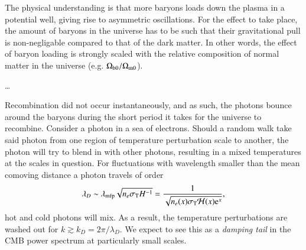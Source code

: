     The physical understanding is that more baryons loads down the plasma in a potential well, giving rise to asymmetric oscillations. For the effect to take place, the amount of baryons in the universe has to be such that their gravitational pull is non-negligable compared to that of the dark matter. In other words, the effect of baryon loading is strongly scaled with the relative composition of normal matter in the universe (e.g. $\Omega_\mathrm{b0}/\Omega_{\mathrm{m}0}$).
    
     \dots
    
    Recombination did not occur instantaneously, and as such, the photons bounce around the baryons during the short period it takes for the universe to recombine. Consider a photon in a sea of electrons. Should a random walk take said photon from one region of temperature perturbation scale to another, the photon will try to blend in with other photons, resulting in a mixed temperatures at the scales in question. For fluctuations with wavelength smaller than the mean comoving distance a photon travels of order
    \begin{equation}
        \lambda_D \sim \lambda\ped{mfp}\sqrt{n_e\sigma\ped{T}H^{-1}} = \frac{1}{\sqrt{n_e(x)\sigma\ped{T}\Hp(x) \eu[x]}},
    \end{equation}
    hot and cold photons will mix. As a result, the temperature perturbations are washed out for $k\gtrsim  k_D = 2\pi/\lambda_D$. We expect to see this as a \textit{damping tail} in the CMB power spectrum at particularly small scales.


    

    




